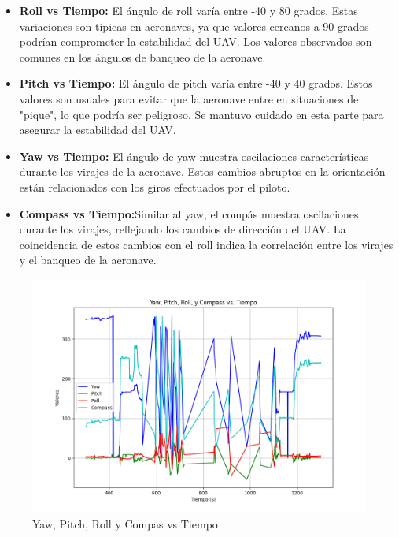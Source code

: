 \begin{itemize}
    \item \textbf{Roll vs Tiempo:} El ángulo de roll varía entre -40 y 80 grados. Estas variaciones son típicas en aeronaves, ya que valores cercanos a 90 grados podrían comprometer la estabilidad del UAV. Los valores observados son comunes en los ángulos de banqueo de la aeronave.\\

    \item \textbf{Pitch vs Tiempo:} El ángulo de pitch varía entre -40 y 40 grados. Estos valores son usuales para evitar que la aeronave entre en situaciones de "pique", lo que podría ser peligroso. Se mantuvo cuidado en esta parte para asegurar la estabilidad del UAV.\\

\item \textbf{Yaw vs Tiempo: }El ángulo de yaw muestra oscilaciones características durante los virajes de la aeronave. Estos cambios abruptos en la orientación están relacionados con los giros efectuados por el piloto.\\

\item \textbf{Compass vs Tiempo:}Similar al yaw, el compás muestra oscilaciones durante los virajes, reflejando los cambios de dirección del UAV. La coincidencia de estos cambios con el roll indica la correlación entre los virajes y el banqueo de la aeronave.
\end{itemize}


\begin{figure}[H]
    \centering
    \includegraphics[width=13 cm]{Imagenes/Vuelo/yaw_pitch_roll_vs_tiempo.png}
    \caption{Yaw, Pitch, Roll y Compas vs Tiempo}
    \label{fig:datosYawPitch, roll}
\end{figure}


